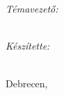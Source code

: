 \begin{titlepage}
\begin{center}
\EGYETEM \\
\KAR \\
\end{center}

\vfill

\begin{center}
\LARGE
\textbf{\CIM}
\normalsize
\end{center}

\vfill

\begin{minipage}[lt]{0.45\linewidth}
\centering
\textit{Témavezető:}\\
\textbf{\TEMAVEZETO}\\
\TEMAVEZETOBEOSZTAS
\end{minipage}
\begin{minipage}[rt]{0.5\linewidth}
\centering
\textit{Készítette:}\\
\textbf{\SZERZO}\\
\SZAK
\end{minipage}

\vfill

\begin{center}
Debrecen, \VEDESEVE
\end{center}

\end{titlepage}

